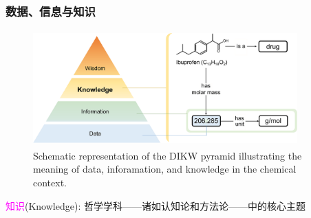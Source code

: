 %
%
\frame
{
	\frametitle{数据、信息与知识}
\begin{figure}[h!]
\centering
\vskip -10pt
\includegraphics[height=1.75in,width=4.00in,viewport=0 0 1490 615,clip]{Figures/DIKW_pyramid-illustrating-data_information-knowledge.png}
\caption{\tiny\textrm{Schematic representation of the DIKW pyramid illustrating the meaning of data, inforamation, and knowledge in the chemical context.\cite{ACR56-128_2023}}}%
\label{Fig:Knowledge-based_system}
\end{figure}
\textcolor{magenta}{知识}\textrm{(Knowledge)}:
\vskip 5pt
哲学学科——诸如认知论和方法论——中的核心主题
}

